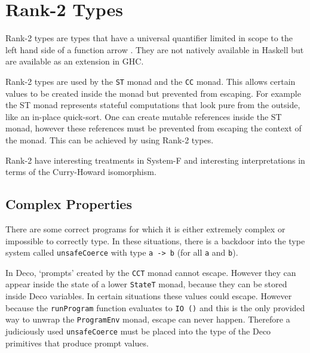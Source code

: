 \documentclass[]{article}
\newcommand{\function}[1]{\texttt{#1}}
\newcommand{\type}[1]{\texttt{#1}}
\begin{document}
\section{Rank-2 Types}
\label{discussion:rank2}

Rank-2 types are types that have a universal quantifier limited in scope to
the left hand side of a function arrow \cite{Wikibook:Haskell}. They are not
natively available in Haskell but are available as an extension in GHC.

Rank-2 types are used by the \type{ST} monad and the \type{CC} monad. This
allows certain values to be created inside the monad but prevented from
escaping. For example the ST monad represents stateful computations that look
pure from the outside, like an in-place quick-sort. One can create mutable
references inside the ST monad, however these references must be prevented
from escaping the context of the monad. This can be achieved by using Rank-2
types.

Rank-2 have interesting treatments in System-F and interesting interpretations
in terms of the Curry-Howard isomorphism.

\subsection{Complex Properties}
\label{discussion:unsafecast}

There are some correct programs for which it is either extremely
complex or impossible to correctly type. In these situations,
there is a backdoor into the type system called \function{unsafeCoerce}
with type \type{a -> b} (for all \type{a} and \type{b}).

In Deco, `prompts' created by the \type{CCT} monad cannot escape. However they
can appear inside the state of a lower \type{StateT} monad, because they can
be stored inside Deco variables. In certain situations these values could
escape. However because the \function{runProgram} function evaluates to
\type{IO ()} and this is the only provided way to unwrap the \type{ProgramEnv}
monad, escape can never happen. Therefore a judiciously used
\function{unsafeCoerce} must be placed into the type of the Deco primitives
that produce prompt values.
\end{document}
